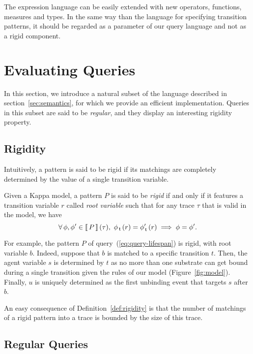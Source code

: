 \documentclass[runningheads]{llncs}
\begin{document}
The expression language can be easily extended with new operators,
functions, measures and types. In the same way than the language for
specifying transition patterns, it should be regarded as a parameter
of our query language and not as a rigid component.


 

\section{Evaluating Queries}

In this section, we introduce a natural subset of the language
described in section~\ref{sec:semantics}, for which we provide an
efficient implementation. Queries in this subset are said to be
\emph{regular}, and they display an interesting {rigidity} property.

\subsection{Rigidity}

Intuitively, a pattern is said to be rigid if its matchings are
completely determined by the value of a single transition variable.
\begin{definition}\label{def:rigidity}
  Given a Kappa model, a pattern $P$ is said to be \emph{rigid} if and
  only if it features a transition variable $r$ called \emph{root
    variable} such that for any trace $\tau$ that is valid in the
  model, we have
  \[ \forall\, \phi, \phi' \in \Sem{P}(\tau), \ \phi_{\Tr}\,(r) =
    \phi'_{\Tr}\,(r) \implies \phi = \phi'. \]
\end{definition}
For example, the pattern $P$ of query~(\ref{eq:query-lifespan})
is rigid, with root variable $b$. Indeed, suppose that $b$ is matched
to a specific transition $t$. Then, the agent variable $s$ is
determined by $t$ as no more than one substrate can get bound during a
single transition given the rules of our model
(Figure~\ref{fig:model}). Finally, $u$ is uniquely determined as the
first unbinding event that targets $s$ after $b$.

An easy consequence of Definition~\ref{def:rigidity} is that the
number of matchings of a rigid pattern into a trace is bounded by the
size of this trace.

\subsection{Regular Queries}
\end{document}
